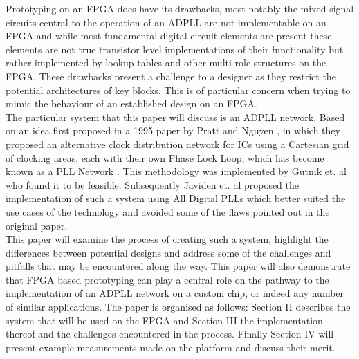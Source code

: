 \documentclass[conference]{IEEEtran}
\begin{document}
Prototyping on an FPGA does have its drawbacks, most notably the mixed-signal circuits central to the operation of an ADPLL are not implementable on an FPGA and while most fundamental digital circuit elements are present these elements are not true transistor level implementations of their functionality but rather implemented by lookup tables and other multi-role structures on the FPGA. These drawbacks present a challenge to a designer as they restrict the potential architectures of key blocks. This is of particular concern when trying to mimic the behaviour of an established design on an FPGA.\\
The particular system that this paper will discuss is an ADPLL network. Based on an idea first proposed in a 1995 paper by Pratt and Nguyen \cite{pratt1995distributed}, in which they proposed an alternative clock distribution network for ICs using a Cartesian grid of clocking areas, each with their own Phase Lock Loop, which has become known as a PLL Network . This methodology was implemented by Gutnik et. al \cite{gutnik2000active} who found it to be feasible. Subsequently Javiden et. al
\cite{javidan2011all} proposed the implementation of such a system using All Digital PLLs which better suited the use cases of the technology and avoided some of the flaws pointed out in the original paper.\\
This paper will examine the process of creating such a system, highlight the differences between potential designs and address some of the challenges and pitfalls that may be encountered along the way. This paper will also demonstrate that FPGA based prototyping can play a central role on the pathway to the implementation of an ADPLL network on a custom chip, or indeed any number of similar applications. The paper is organised as follows: Section II describes the system that will be used on the FPGA and Section III the implementation thereof and the challenges encountered in the process. Finally Section IV will present example measurements made on the platform and discuss their merit.
\end{document}
